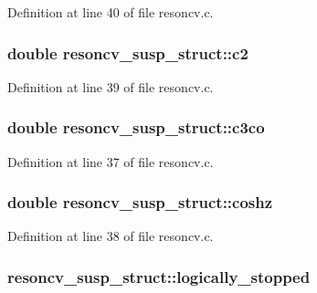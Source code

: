 Definition at line 40 of file resoncv.\+c.

\subsubsection[{\texorpdfstring{c2}{c2}}]{\setlength{\rightskip}{0pt plus 5cm}double resoncv\+\_\+susp\+\_\+struct\+::c2}\hypertarget{structresoncv__susp__struct_af82481b48e39adfa43c312a476d4f7b7}{}\label{structresoncv__susp__struct_af82481b48e39adfa43c312a476d4f7b7}


Definition at line 39 of file resoncv.\+c.

\subsubsection[{\texorpdfstring{c3co}{c3co}}]{\setlength{\rightskip}{0pt plus 5cm}double resoncv\+\_\+susp\+\_\+struct\+::c3co}\hypertarget{structresoncv__susp__struct_a8ddc7f8ebc7d4bd8e5e21efdc4415f52}{}\label{structresoncv__susp__struct_a8ddc7f8ebc7d4bd8e5e21efdc4415f52}


Definition at line 37 of file resoncv.\+c.

\subsubsection[{\texorpdfstring{coshz}{coshz}}]{\setlength{\rightskip}{0pt plus 5cm}double resoncv\+\_\+susp\+\_\+struct\+::coshz}\hypertarget{structresoncv__susp__struct_ac6b49502e913e68dcf0d40401c69cd22}{}\label{structresoncv__susp__struct_ac6b49502e913e68dcf0d40401c69cd22}


Definition at line 38 of file resoncv.\+c.

\subsubsection[{\texorpdfstring{logically\+\_\+stopped}{logically_stopped}}]{ resoncv\+\_\+susp\+\_\+struct\+::logically\+\_\+stopped}\hypertarget{structresoncv__susp__struct_a53b3ab376586d9a3488f596cfb0a1c8e}{}\label{structresoncv__susp__struct_a53b3ab376586d9a3488f596cfb0a1c8e}


